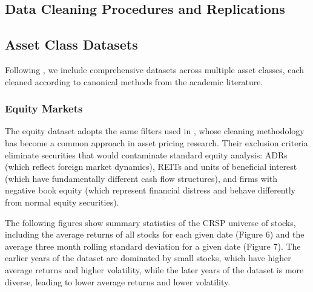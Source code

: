 \documentclass{article}
\begin{document}
\begin{appendices}

\section{Data Cleaning Procedures and Replications}
\label{app:data_cleaning_and_replications}

\subsection{Asset Class Datasets}
\label{sec:asset_classes}


Following \cite{He2017}, we include comprehensive datasets across multiple asset classes, each cleaned according to canonical methods from the academic literature.

\subsubsection{Equity Markets}
\label{sec:equity}

The equity dataset adopts the same filters used in \cite{Fama1993}, whose cleaning methodology has 
become a common approach in asset pricing research.
Their exclusion criteria eliminate securities that would 
contaminate standard equity analysis: ADRs (which reflect foreign market dynamics), 
REITs and units of beneficial interest (which have fundamentally different 
cash flow structures), and firms with negative book equity 
(which represent financial distress and behave differently from normal equity 
securities). 

The following figures show summary statistics of the CRSP universe of stocks, 
including the average returns of all stocks for each given date (Figure 6) 
and the average three month rolling standard deviation for a given date (Figure 7).
The earlier years of the dataset are dominated by small stocks, 
which have higher average returns and higher volatility, while the later years of 
the dataset is more diverse, leading to lower average returns and lower volatility.


\end{appendices}
\end{document}
